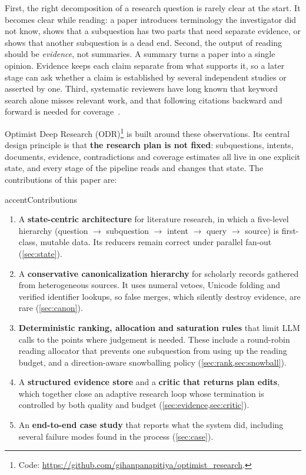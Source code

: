 \documentclass{article}
\newcommand{\sys}{ODR}
\newcommand{\sysfull}{Optimist Deep Research}
\begin{document}
First, the right decomposition of a research question is rarely clear at the start. It becomes clear while reading: a paper introduces terminology the investigator did not know, shows that a subquestion has two parts that need separate evidence, or shows that another subquestion is a dead end. Second, the output of reading should be \emph{evidence}, not summaries. A summary turns a paper into a single opinion. Evidence keeps each claim separate from what supports it, so a later stage can ask whether a claim is established by several independent studies or asserted by one. Third, systematic reviewers have long known that keyword search alone misses relevant work, and that following citations backward and forward is needed for coverage~\citep{wohlin2014guidelines,kitchenham2004procedures}.

\sysfull{} (\sys{})\footnote{Code: \url{https://github.com/gihanpanapitiya/optimist_research}.} is built around these observations. Its central design principle is
that \textbf{the research plan is not fixed}: subquestions, intents,
documents, evidence, contradictions and coverage estimates all live in one
explicit state, and every stage of the pipeline reads and changes that
state. The contributions of this paper are:

\begin{callout}[unbreakable]{accent}{Contributions}
\begin{enumerate}[leftmargin=*]
  \item A \textbf{state-centric architecture} for literature research, in
    which a five-level hierarchy (question $\to$ subquestion $\to$ intent
    $\to$ query $\to$ source) is first-class, mutable data. Its reducers
    remain correct under parallel fan-out (\cref{sec:state}).
  \item A \textbf{conservative canonicalization hierarchy} for scholarly
    records gathered from heterogeneous sources. It uses numeral vetoes,
    Unicode folding and verified identifier lookups, so false merges, which
    silently destroy evidence, are rare (\cref{sec:canon}).
  \item \textbf{Deterministic ranking, allocation and saturation rules} that
    limit LLM calls to the points where judgement is needed. These include a
    round-robin reading allocator that prevents one subquestion from using
    up the reading budget, and a direction-aware snowballing policy
    (\cref{sec:rank,sec:snowball}).
  \item A \textbf{structured evidence store} and a \textbf{critic that
    returns plan edits}, which together close an adaptive research loop
    whose termination is controlled by both quality and budget
    (\cref{sec:evidence,sec:critic}).
  \item An \textbf{end-to-end case study} that reports what the system did,
    including several failure modes found in the process
    (\cref{sec:case}).
\end{enumerate}
\end{callout}
\end{document}
